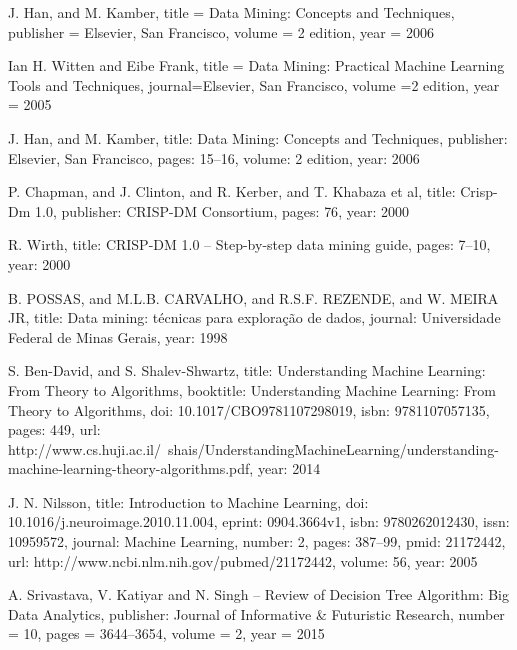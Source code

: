 \documentclass[conference,compsoc]{IEEEtran}
\begin{document}
\begin{thebibliography}{1}
  
  J. Han, and M. Kamber,
  title = {Data Mining: Concepts and Techniques},
  publisher = {Elsevier, San Francisco},
  volume = {2 edition},
  year = {2006}


  Ian H. Witten and Eibe Frank,
  title = {Data Mining: Practical Machine Learning Tools and Techniques},
  journal={Elsevier, San Francisco},
  volume ={2 edition},
  year = {2005}

  
  J. Han, and M. Kamber,
  title: {Data Mining: Concepts and Techniques},
  publisher: {Elsevier, San Francisco},
  pages: {15--16},
  volume: {2 edition},
  year: {2006}

  
  P. Chapman, and J. Clinton, and R. Kerber, and T. Khabaza et al,
  title: {Crisp-Dm 1.0},
  publisher: {CRISP-DM Consortium},
  pages: {76},
  year: {2000}

  R. Wirth,
  title: {CRISP-DM 1.0 – Step-by-step data mining guide},
  pages: {7--10},
  year: {2000}

  
  B. POSSAS, and M.L.B. CARVALHO, and R.S.F. REZENDE, and W. MEIRA JR,
  title: {Data mining: t{\'e}cnicas para explora{\c{c}}{\~a}o de dados},
  journal: {Universidade Federal de Minas Gerais},
  year: {1998}

  
  
  S. Ben-David, and S. Shalev-Shwartz,
  title: {Understanding Machine Learning: From Theory to Algorithms},
  booktitle: {Understanding Machine Learning: From Theory to Algorithms},
  doi: {10.1017/CBO9781107298019},
  isbn: {9781107057135},
  pages: {449},
  url: {http://www.cs.huji.ac.il/{~}shais/UnderstandingMachineLearning/understanding-machine-learning-theory-algorithms.pdf},
  year: {2014}

  

  J. N. Nilsson,
  title: {Introduction to Machine Learning},
  doi: {10.1016/j.neuroimage.2010.11.004},
  eprint: {0904.3664v1},
  isbn: {9780262012430},
  issn: {10959572},
  journal: {Machine Learning},
  number: {2},
  pages: {387--99},
  pmid: {21172442},
  url: {http://www.ncbi.nlm.nih.gov/pubmed/21172442},
  volume: {56},
  year: {2005}  
  

  A. Srivastava, V. Katiyar and N. Singh -- Review of Decision Tree Algorithm: Big Data Analytics,
  publisher: {Journal of Informative \& Futuristic Research},
  number = {10},
  pages = {3644--3654},
  volume = {2},
  year = {2015}
  

\end{thebibliography}
\end{document}
